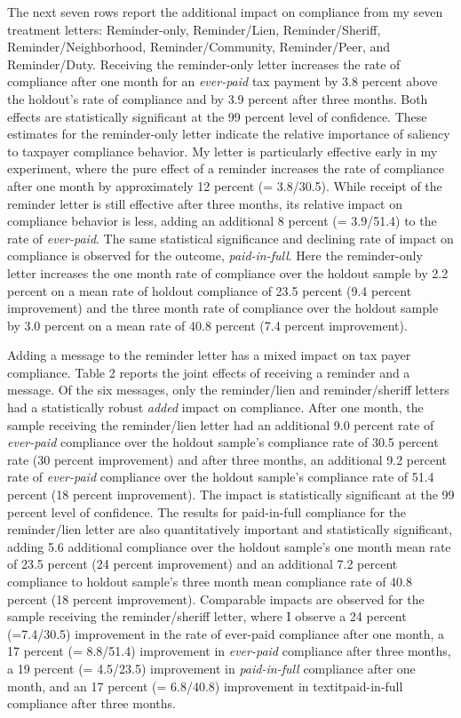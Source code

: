 The next seven rows report the additional impact on compliance from
my seven treatment letters: Reminder-only, Reminder/Lien,
Reminder/Sheriff, Reminder/Neighborhood, Reminder/Community,
Reminder/Peer, and Reminder/Duty.  Receiving the reminder-only letter
increases the rate of compliance after one month for an
\textit{ever-paid} tax payment by 3.8 percent above the holdout's rate
of compliance and by 3.9 percent after three months.  Both effects are
statistically significant at the 99 percent level of confidence.
These estimates for the reminder-only letter indicate the relative
importance of saliency to taxpayer compliance behavior.  My letter
is particularly effective early in my experiment, where the pure
effect of a reminder increases the rate of compliance after one month
by approximately 12 percent (= 3.8/30.5).  While receipt of the
reminder letter is still effective after three months, its relative
impact on compliance behavior is less, adding an additional 8 percent
(= 3.9/51.4) to the rate of \textit{ever-paid}.  The same statistical
significance and declining rate of impact on compliance is observed
for the outcome, \textit{paid-in-full}.  Here the reminder-only letter
increases the one month rate of compliance over the holdout sample by
2.2 percent on a mean rate of holdout compliance of 23.5 percent (9.4
percent improvement) and the three month rate of compliance over the
holdout sample by 3.0 percent on a mean rate of 40.8 percent (7.4
percent improvement).

Adding a message to the reminder letter has a mixed impact on tax
payer compliance.  Table 2 reports the joint effects of receiving a
reminder and a message.  Of the six messages, only the reminder/lien
and reminder/sheriff letters had a statistically robust \textit{added} impact
on compliance.  After one month, the sample receiving the
reminder/lien letter had an additional 9.0 percent rate of
\textit{ever-paid} compliance over the holdout sample's compliance
rate of 30.5 percent rate (30 percent improvement) and after three
months, an additional 9.2 percent rate of \textit{ever-paid}
compliance over the holdout sample's compliance rate of 51.4 percent
(18 percent improvement).  The impact is statistically significant at
the 99 percent level of confidence.  The results for paid-in-full
compliance for the reminder/lien letter are also quantitatively
important and statistically significant, adding 5.6 additional
compliance over the holdout sample's one month mean rate of 23.5
percent (24 percent improvement) and an additional 7.2 percent
compliance to holdout sample's three month mean compliance rate of
40.8 percent (18 percent improvement).  Comparable impacts are
observed for the sample receiving the reminder/sheriff letter, where
I observe a 24 percent (=7.4/30.5) improvement in the rate of
ever-paid compliance after one month, a 17 percent (= 8.8/51.4)
improvement in \textit{ever-paid} compliance after three months, a 19
percent (= 4.5/23.5) improvement in \textit{paid-in-full} compliance
after one month, and an 17 percent (= 6.8/40.8) improvement in
textit{paid-in-full} compliance after three months.

